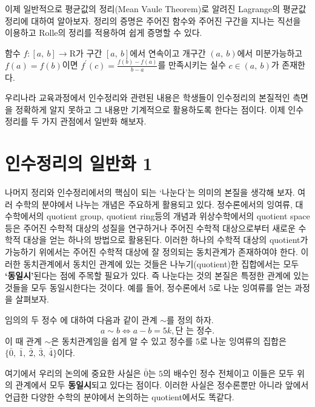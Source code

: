 \documentclass[a4paper]{article}
\begin{document}
이제 일반적으로 평균값의 정리(Mean Vaule Theorem)로 알려진 Lagrange의 평균값 정리에 대하여 알아보자. 정리의 증명은 주어진 함수와 주어진 구간을 지나는 직선을 이용하고 Rolle의 정리를 적용하여 쉽게 증명할 수 있다.

\begin{theorem}
 함수 $f:[a,\: b]\to\mathrm{R}$가 구간 $[a,\: b]$에서 연속이고 개구간 $(a,\: b)$에서 미분가능하고 $f(a)=f(b)$이면 $f^{\prime}(c)=\frac{f(b)-f(a)}{b-a}$를 만족시키는 실수 $c \in(a,\: b)$가 존재한다.

\end{theorem}
  

  우리나라 교육과정에서 인수정리와 관련된 내용은 학생들이 인수정리의 본질적인 측면을 정확하게 알지 못하고 그 내용만 기계적으로 활용하도록 한다는 점이다. 이제 인수정리를 두 가지 관점에서 일반화 해보자.
  
\section{인수정리의 일반화 1}

  나머지 정리와 인수정리에서의 핵심이 되는 ‘나눈다’는 의미의 본질을 생각해 보자. 여러
수학의 분야에서 나누는 개념은 주요하게 활용되고 있다. 정수론에서의 잉여류, 대수학에서의 quotient group, quotient ring등의 개념과 위상수학에서의 quotient space등은 주어진 수학적 대상의 성질을 연구하거나 주어진 수학적 대상으로부터 새로운 수학적 대상을 얻는 하나의 방법으로 활용된다. 이러한 하나의 수학적 대상의 quotient가 가능하기 위에서는 주어진 수학적 대상에 잘 정의되는 동치관계가 존재하여야 한다. 이러한 동치관계에서 동치인 관계에 있는 것들은 나누기(quotient)한 집합에서는 모두 \textbf{‘동일시’}된다는 점에 주목할 필요가 있다. 즉 나눈다는 것의 본질은 특정한 관계에 있는 것들을 모두 동일시한다는 것이다. 예를 들어, 정수론에서 $5$로 나눈 잉여류를 얻는 과정을 살펴보자.

  임의의 두 정수 에 대하여 다음과 같이 관계 $\sim$를 정의 하자.
\[
a \sim b \Longleftrightarrow a-b=5k, \text{단 는 정수.}
\]
이 때 관계 $\sim$은 동치관계임을 쉽게 알 수 있고 정수를 $5$로 나눈 잉여류의 집합은 $\{ \bar{0},\: \bar{1}, \:\bar{2},\: \bar{3},\: \bar{4} \}$이다. 

  여기에서 우리의 논의에 중요한 사실은 $\bar{0}$는 $5$의 배수인 정수 전체이고 이들은 모두 위의 관계에서 모두 \textbf{동일시}되고 있다는 점이다. 이러한 사실은 정수론뿐만 아니라 앞에서 언급한 다양한 수학의 분야에서 논의하는 quotient에서도 똑같다.
\end{document}
